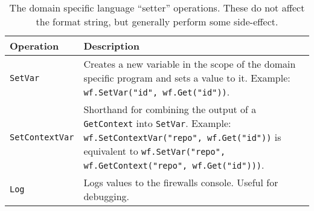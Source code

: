 \begin{table}[h]
\centering

\begin{tabular}{ m{2.5cm} m{11.5cm}  } 
 \hline
 Operation & Description \\ 
 \hline \hline

 \lstinline|SetVar| & Creates a new variable in the scope of the domain specific program and sets a value to it. \newline Example: \lstinline|wf.SetVar("id", wf.Get("id"))|. \\ \hline

 \lstinline|SetContextVar| & Shorthand for combining the output of a \lstinline|GetContext| into \lstinline|SetVar|. \newline Example: \lstinline|wf.SetContextVar("repo", wf.Get("id"))| is equivalent to \lstinline|wf.SetVar("repo", wf.GetContext("repo", wf.Get("id")))|. \\ \hline

 \lstinline|Log| & Logs values to the firewalls console. Useful for debugging. \\ \hline

\end{tabular}
\caption{The domain specific language ``setter'' operations. These do not affect the format string, but generally perform some side-effect.}
\label{Table:DSL_SetterOperations}
\end{table}






